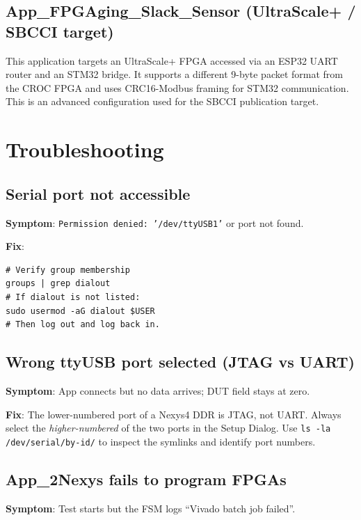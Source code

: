\documentclass[12pt, a4paper]{report}
\begin{document}
\section{App\_FPGAging\_Slack\_Sensor (UltraScale+ / SBCCI target)}

This application targets an UltraScale+ FPGA accessed via an ESP32 UART router
and an STM32 bridge. It supports a different 9-byte packet format from the CROC
FPGA and uses CRC16-Modbus framing for STM32 communication.
This is an advanced configuration used for the SBCCI publication target.

\chapter{Troubleshooting}
\label{ch:troubleshooting}

\section{Serial port not accessible}

\textbf{Symptom}: \texttt{Permission denied: '/dev/ttyUSB1'} or port not found.

\textbf{Fix}:
\begin{lstlisting}[style=shell]
# Verify group membership
groups | grep dialout
# If dialout is not listed:
sudo usermod -aG dialout $USER
# Then log out and log back in.
\end{lstlisting}

\section{Wrong ttyUSB port selected (JTAG vs UART)}

\textbf{Symptom}: App connects but no data arrives; DUT field stays at zero.

\textbf{Fix}: The lower-numbered port of a Nexys4 DDR is JTAG, not UART.
Always select the \emph{higher-numbered} of the two ports in the Setup Dialog.
Use \texttt{ls -la /dev/serial/by-id/} to inspect the symlinks and identify
port numbers.

\section{App\_2Nexys fails to program FPGAs}

\textbf{Symptom}: Test starts but the FSM logs ``Vivado batch job failed''.
\end{document}
